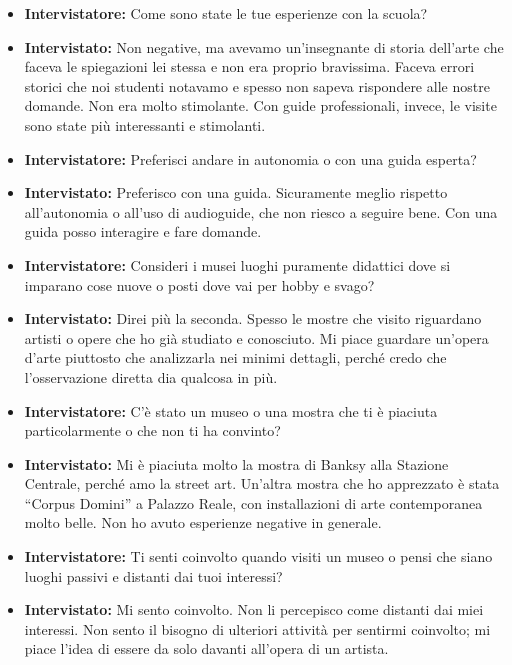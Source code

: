\documentclass{article}
\begin{document}
\begin{itemize}
    \item \textbf{Intervistatore:} Come sono state le tue esperienze con la scuola?

    \item \textbf{Intervistato:} Non negative, ma avevamo un’insegnante di storia dell’arte che faceva le spiegazioni lei stessa e non era proprio bravissima. Faceva errori storici che noi studenti notavamo e spesso non sapeva rispondere alle nostre domande. Non era molto stimolante. Con guide professionali, invece, le visite sono state più interessanti e stimolanti.

    \item \textbf{Intervistatore:} Preferisci andare in autonomia o con una guida esperta?

    \item \textbf{Intervistato:} Preferisco con una guida. Sicuramente meglio rispetto all’autonomia o all’uso di audioguide, che non riesco a seguire bene. Con una guida posso interagire e fare domande.

    \item \textbf{Intervistatore:} Consideri i musei luoghi puramente didattici dove si imparano cose nuove o posti dove vai per hobby e svago?

    \item \textbf{Intervistato:} Direi più la seconda. Spesso le mostre che visito riguardano artisti o opere che ho già studiato e conosciuto. Mi piace guardare un’opera d’arte piuttosto che analizzarla nei minimi dettagli, perché credo che l’osservazione diretta dia qualcosa in più.

    \item \textbf{Intervistatore:} C’è stato un museo o una mostra che ti è piaciuta particolarmente o che non ti ha convinto?

    \item \textbf{Intervistato:} Mi è piaciuta molto la mostra di Banksy alla Stazione Centrale, perché amo la street art. Un’altra mostra che ho apprezzato è stata “Corpus Domini” a Palazzo Reale, con installazioni di arte contemporanea molto belle. Non ho avuto esperienze negative in generale.

    \item \textbf{Intervistatore:} Ti senti coinvolto quando visiti un museo o pensi che siano luoghi passivi e distanti dai tuoi interessi?

    \item \textbf{Intervistato:} Mi sento coinvolto. Non li percepisco come distanti dai miei interessi. Non sento il bisogno di ulteriori attività per sentirmi coinvolto; mi piace l’idea di essere da solo davanti all’opera di un artista.


\end{itemize}
\end{document}
